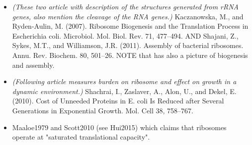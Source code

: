 {\begin{itemize}
        \item \textit{(These two article with description of the structures generated from rRNA genes, also mention the cleavage of the RNA genes.)}  Kaczanowska, M., and Ryden-Aulin, M. (2007). Ribosome Biogenesis and the Translation Process in Escherichia coli. Microbiol. Mol. Biol. Rev. 71, 477–494. \cite{Kaczanowska2007} AND Shajani, Z., Sykes, M.T., and Williamson, J.R. (2011). Assembly of bacterial ribosomes. Annu. Rev. Biochem. 80, 501–26. \cite{Shajani2011}
        NOTE that \cite{Chen2013} has also a picture of biogenesis and assembly.
        \item \textit{(Following article measures burden on ribosome and effect on growth in a dynamic environment.)} Shachrai, I., Zaslaver, A., Alon, U., and Dekel, E. (2010). Cost of Unneeded Proteins in E. coli Is Reduced after Several Generations in Exponential Growth. Mol. Cell 38, 758–767.        
        \cite{Shachrai2010}
        \item Maaloe1979 and Scott2010 (see Hui2015) which claims that ribosomes operate at "saturated translational capacity".
    \end{itemize} 
    
\clearpage    
}
















